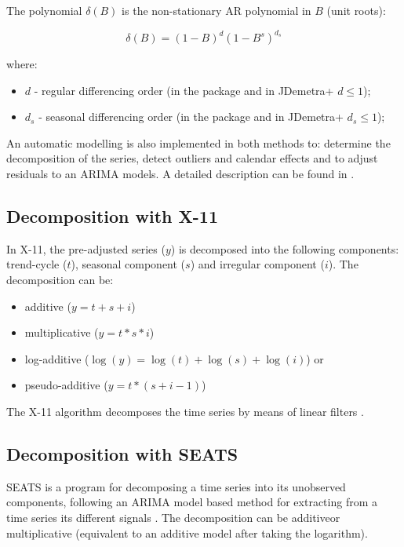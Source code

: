 \documentclass[article]{jss}
\providecommand{\tightlist}{%
  \setlength{\itemsep}{0pt}\setlength{\parskip}{0pt}}
\begin{document}
The polynomial \(\delta(B)\) is the non-stationary AR polynomial in
\(B\) (unit roots):

\[\delta(B)=(1-B)^d(1-B^s)^{d_s}\]

where:

\begin{itemize}
\tightlist
\item
  \(d\) - regular differencing order (in the package and in JDemetra+
  \(d \le 1\));
\item
  \(d_s\) - seasonal differencing order (in the package and in JDemetra+
  \(d_s \le 1\));
\end{itemize}

An automatic modelling is also implemented in both methods to: determine
the decomposition of the series, detect outliers and calendar effects
and to adjust residuals to an ARIMA models. A detailed description can
be found in \cite{gomez1998automatic}.

\hypertarget{sa-x11}{%
\subsection{Decomposition with X-11}\label{sa-x11}}

In X-11, the pre-adjusted series (\(y\)) is decomposed into the
following components: trend-cycle (\(t\)), seasonal component (\(s\))
and irregular component (\(i\)). The decomposition can be:

\begin{itemize}
\tightlist
\item
  additive (\(y = t + s + i\))\\
\item
  multiplicative (\(y = t * s * i\))\\
\item
  log-additive (\(\log(y) = \log(t) + \log(s) + \log(i)\)) or\\
\item
  pseudo-additive (\(y = t * (s + i - 1)\))
\end{itemize}

The X-11 algorithm decomposes the time series by means of linear filters
\citep{findleyx12, ladiray1999x11en}.

\hypertarget{sa-seats}{%
\subsection{Decomposition with SEATS}\label{sa-seats}}

SEATS is a program for decomposing a time series into its unobserved
components, following an ARIMA model based method for extracting from a
time series its different signals
\citep{gomez1996programs, caporello2004program}. The decomposition can
be additiveor multiplicative (equivalent to an additive model after
taking the logarithm).
\end{document}
